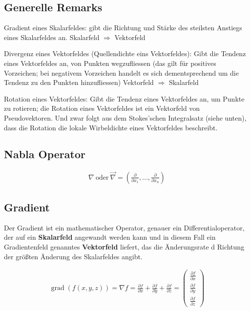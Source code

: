 \documentclass[a4paper, 10pt]{scrartcl}
\begin{document}
		\subsection{Generelle Remarks}
		Gradient eines Skalarfeldes: gibt die Richtung und Stärke des steilsten Anstiegs
		eines Skalarfeldes an.
		Skalarfeld $\Rightarrow$ Vektorfeld
		
		Divergenz eines Vektorfeldes (Quellendichte eins Vektorfeldes): Gibt die Tendenz
		eines Vektorfeldes an, von Punkten wegzufliessen (das gilt für positives
		Vorzeichen; bei negativem Vorzeichen handelt es sich dementsprechend um die
		Tendenz zu den Punkten hinzufliessen) Vektorfeld $\Rightarrow$ Skalarfeld
		
		Rotation eines Vektorfeldes: Gibt die Tendenz eines Vektorfeldes an, um Punkte
		zu rotieren; die Rotation eines Vektorfeldes ist ein Vektorfeld von
		Pseudovektoren. Und zwar folgt aus dem Stokes’schen Integralsatz (siehe unten),
		dass die Rotation die lokale Wirbeldichte eines Vektorfeldes beschreibt.
		
		\subsection{Nabla Operator}
		
		\begin{align}
			\nabla \: \mathrm{oder} \: \vec \nabla = \left (\frac\partial{\partial
				x_1},\ldots, \frac\partial{\partial x_n}\right)
		\end{align}
		\subsection{Gradient}
		Der Gradient ist ein mathematischer Operator, genauer ein Differentialoperator,
		der auf ein \textbf{Skalarfeld} angewandt werden kann und in diesem Fall ein
		Gradientenfeld genanntes \textbf{Vektorfeld} liefert, das die Änderungsrate d
		Richtung der größten Änderung des Skalarfeldes angibt.
		
		\begin{align}
			\operatorname{grad}(f(x,y,z)) = \nabla f = \frac{{\partial f}}{{\partial x}} +
			\frac{{\partial f}}{{\partial y}} + \frac{{\partial f}}{{\partial z}} = 
			\begin{pmatrix} \frac{\partial f}{\partial x} \\ \frac{\partial f}{\partial
					y} \\ \frac{\partial f}{\partial z} \end{pmatrix}
		\end{align}
		
\end{document}

